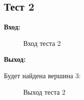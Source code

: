 \documentclass[a4paper]{article}
\begin{document}
\subsection{Тест 2}

\textbf{Вход:}
  \begin{figure}[!h]
    \caption{Вход теста 2}
  \end{figure}
\par
\textbf{Выход:} \par
  Будет найдена вершина 3:
  \begin{figure}[!h]
    \caption{Выход теста 2}
  \end{figure}
\newpage  
\end{document}
